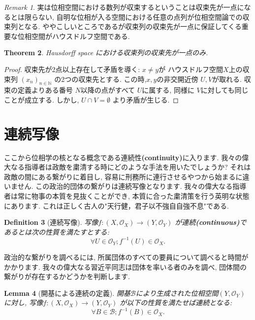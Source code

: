 \documentclass[lualatex]{ltjsbook}
\newtheorem{theorem}{Theorem}[section]
\newtheorem{lemma}[theorem]{Lemma}
\newtheorem{definition}[theorem]{Definition}
\theoremstyle{remark}
\newtheorem{remark}[theorem]{Remark}
\theoremstyle{plain}
\begin{document}
\begin{remark}
実は位相空間における数列が収束するということは収束先が一点になるとは限らない, 自明な位相が入る空間における任意の点列が位相空間論での収束列となる. 
ややこしいところであるが収束列の収束先が一点に保証してくる重要な位相空間がハウスドルフ空間である.	
\end{remark}

\begin{theorem}
Hausdorff space における収束列の収束先が一点のみ.
\end{theorem}

\begin{proof}
	収束先が2点以上存在して矛盾を導く: $x \neq y$が ハウスドルフ空間$X$上の収束列 $\left( x_n \right) _{n \in \mathbb{N} }$ の2つの収束先とする. 
	この時,$x,y$の非交開近傍 $U,V$が取れる. 
	収束の定義よりある番号 $N$以降の点がすべて $U$に属する, 同様に $V$に対しても同じことが成立する. 
	しかし,  $U\cap V = \emptyset$ より矛盾が生じる.
\end{proof}

\section{連続写像}%
\label{sec:連続写像}
ここから位相学の核となる概念である連続性\textbf{(continuity)}に入ります.
我々の偉大なる指導者は政敵を粛清する時にどのような手法を用いたでしょうか? 
それは政敵の間にある繋がりに着目し, 容易に刑務所に連行させるやつから始まるに違いません. この政治的団体の繋がりは連続写像となります. 
我々の偉大なる指導者は常に物事の本質を見抜くことができ, 本質に合った粛清策を行う英明な状態にあります. これは正しく古人の"天行健，君子以不強自自強不息"である.
\begin{definition}[連続写像]
	写像$f: \left( X , \mathcal{O}_X \right) \to \left( Y, \mathcal{O}_Y \right) $ が連続\textbf{(continuous)}であるとは次の性質を満たすとする:
	\[
	\forall U \in \mathcal{O}_Y; f^{-1}\left( U \right) \in \mathcal{O}_X 
	.\] 
\end{definition}

政治的な繋がりを調べるには, 所属団体のすべての要員について調べると時間がかかります. 我々の偉大なる習近平同志は団体を率いる者のみを調べ, 団体間の繋がりが存在するかどうかを判断します.

\begin{lemma}[開基による連続の定義]
開基$\mathcal{B}$により生成された位相空間$\left( Y, \mathcal{O}_Y \right) $に対し,
写像$f: \left( X , \mathcal{O}_X \right) \to \left( Y, \mathcal{O}_Y \right) $ が以下の性質を満たせば連続となる:
\[
\forall B \in \mathcal{B}; f^{-1}\left( B \right) \in \mathcal{O}_X
.\] 

\end{lemma}
\end{document}
